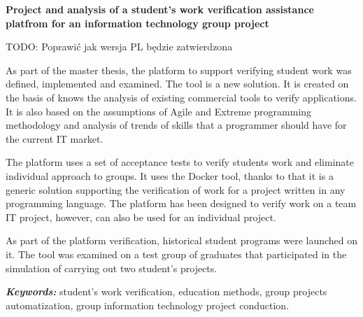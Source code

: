\vfill
\pagebreak

\begin{center}
    \textbf{Project and analysis of a student's work verification assistance platfrom for an information technology group project}
\end{center}
 \newline
TODO: Poprawić jak wersja PL będzie zatwierdzona

As part of the master thesis, the platform to support verifying student work was defined, implemented and examined.
The tool is a new solution.
It is created on the basis of knows the analysis of existing commercial tools to verify applications.
It is also based on the assumptions of Agile and Extreme programming methodology and analysis of trends of skills that a programmer should have for the current IT market.

The platform uses a set of acceptance tests to verify students work and eliminate individual approach to groups.
It uses the Docker tool, thanks to that it is a generic solution supporting the verification of work for a project written in any programming language.
The platform has been designed to verify work on a team IT project, however, can also be used for an individual project.

As part of the platform verification, historical student programs were launched on it.
The tool was examined on a test group of graduates that participated in the simulation of carrying out two student's projects. \newline

\textit{\textbf{Keywords:}} student's work verification, education methods, group projects automatization, group information technology project conduction.

\cleardoublepage
